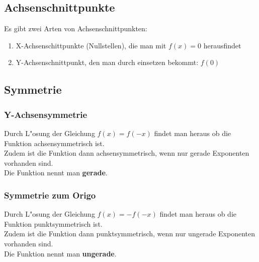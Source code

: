 \subsection{Achsenschnittpunkte}

Es gibt zwei Arten von Achsenschnittpunkten:
\begin{enumerate}
\item X-Achsenschittpunkte (Nullstellen), die man mit $f(x)=0$ herausfindet
\item Y-Achsenschnittpunkt, den man durch einsetzen bekommt: $f(0)$ \\
\end{enumerate}

\subsection{Symmetrie}

\subsubsection{Y-Achsensymmetrie}

Durch L"osung der Gleichung $f(x)=f(-x)$ findet man heraus ob die Funktion achsensymmetrisch ist.\\
Zudem ist die Funktion dann achsensymmetrisch, wenn nur gerade Exponenten vorhanden sind.\\
Die Funktion nennt man \textbf{gerade}.\\

\subsubsection{Symmetrie zum Origo}

Durch L"osung der Gleichung $f(x)=-f(-x)$ findet man heraus ob die Funktion punktsymmetrisch ist.\\
Zudem ist die Funktion dann punktsymmetrisch, wenn nur ungerade Exponenten vorhanden sind.\\
Die Funktion nennt man \textbf{ungerade}.\\


